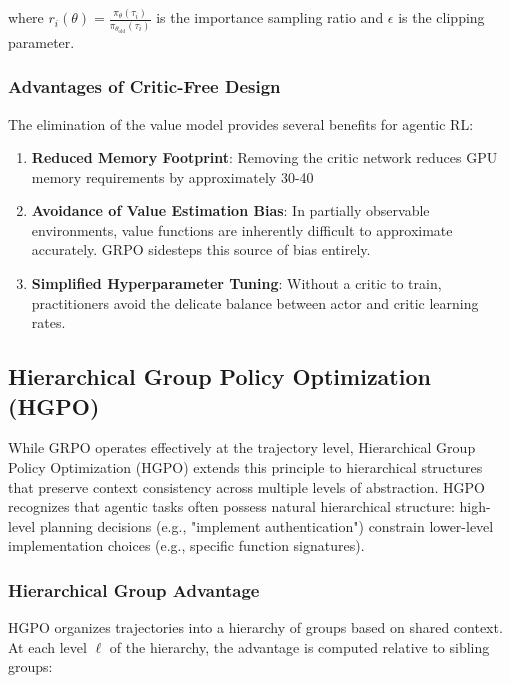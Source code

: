 where $r_i(\theta) = \frac{\pi_\theta(\tau_i)}{\pi_{\theta_{\text{old}}}(\tau_i)}$ is the importance sampling ratio and $\epsilon$ is the clipping parameter.

\subsubsection{Advantages of Critic-Free Design}

The elimination of the value model provides several benefits for agentic RL:

\begin{enumerate}
    \item \textbf{Reduced Memory Footprint}: Removing the critic network reduces GPU memory requirements by approximately 30-40%

    \item \textbf{Avoidance of Value Estimation Bias}: In partially observable environments, value functions are inherently difficult to approximate accurately. GRPO sidesteps this source of bias entirely.

    \item \textbf{Simplified Hyperparameter Tuning}: Without a critic to train, practitioners avoid the delicate balance between actor and critic learning rates.

\end{enumerate}
\subsection{Hierarchical Group Policy Optimization (HGPO)}

While GRPO operates effectively at the trajectory level, Hierarchical Group Policy Optimization (HGPO) extends this principle to hierarchical structures that preserve context consistency across multiple levels of abstraction. HGPO recognizes that agentic tasks often possess natural hierarchical structure: high-level planning decisions (e.g., "implement authentication") constrain lower-level implementation choices (e.g., specific function signatures).

\subsubsection{Hierarchical Group Advantage}

HGPO organizes trajectories into a hierarchy of groups based on shared context. At each level $\ell$ of the hierarchy, the advantage is computed relative to sibling groups:

